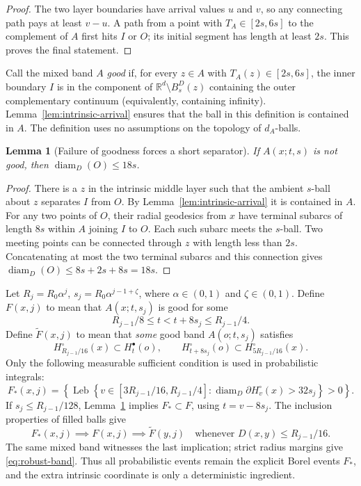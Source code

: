 \documentclass[11pt,reqno]{amsart}
\theoremstyle{plain}
\newtheorem{lemma}[theorem]{Lemma}
\theoremstyle{definition}
\theoremstyle{remark}
\newcommand{\R}{\mathbb R}
\newcommand{\diam}{\operatorname{diam}}
\newcommand{\1}{\mathbf{1}}
\begin{document}
\begin{proof}
The two layer boundaries have arrival values $u$ and $v$, so any connecting path pays at least $v-u$. A path from a point with $T_A\in[2s,6s]$ to the complement of $A$ first hits $I$ or $O$; its initial segment has length at least $2s$. This proves the final statement.
\end{proof}

Call the mixed band $A$ \emph{good} if, for every $z\in A$ with $T_A(z)\in[2s,6s]$, the inner boundary $I$ is in the component of $\R^d\setminus B_s^D(z)$ containing the outer complementary continuum (equivalently, containing infinity). Lemma~\ref{lem:intrinsic-arrival} ensures that the ball in this definition is contained in $A$. The definition uses no assumptions on the topology of $d_A$-balls.

\begin{lemma}[Failure of goodness forces a short separator]\label{lem:good-failure}
If $A(x;t,s)$ is not good, then $\diam_D(O)\le18s$.
\end{lemma}
\begin{proof}
There is a $z$ in the intrinsic middle layer such that the ambient $s$-ball about $z$ separates $I$ from $O$. By Lemma~\ref{lem:intrinsic-arrival} it is contained in $A$. For any two points of $O$, their radial geodesics from $x$ have terminal subarcs of length $8s$ within $A$ joining $I$ to $O$. Each such subarc meets the $s$-ball. Two meeting points can be connected through $z$ with length less than $2s$. Concatenating at most the two terminal subarcs and this connection gives $\diam_D(O)\le8s+2s+8s=18s$.
\end{proof}

Let $R_j=R_0\alpha^j$, $s_j=R_0\alpha^{j-1+\zeta}$, where $\alpha\in(0,1)$ and $\zeta\in(0,1)$. Define $F(x,j)$ to mean that $A(x;t,s_j)$ is good for some
\[
R_{j-1}/8\le t<t+8s_j\le R_{j-1}/4.
\]
Define $\widetilde F(x,j)$ to mean that \emph{some} good band $A(o;t,s_j)$ satisfies
\begin{equation}\label{eq:robust-band}
H_{R_{j-1}/16}^\circ(x)\subset H_t^\bullet(o),\qquad
H_{t+8s_j}^\circ(o)\subset H_{5R_{j-1}/16}^\circ(x).
\end{equation}
Only the following measurable sufficient condition is used in probabilistic integrals:
\begin{equation}\label{eq:Fstar}
F_*(x,j)=\left\{\operatorname{Leb}\left\{v\in[3R_{j-1}/16,R_{j-1}/4]:
\diam_D\partial H_v^\circ(x)>32s_j\right\}>0\right\}.
\end{equation}
If $s_j\le R_{j-1}/128$, Lemma~\ref{lem:good-failure} implies $F_*\subset F$, using $t=v-8s_j$. The inclusion properties of filled balls give
\begin{equation}\label{eq:F-robust}
F_*(x,j)\implies F(x,j)\implies\widetilde F(y,j)
\quad\text{whenever }D(x,y)\le R_{j-1}/16.
\end{equation}
The same mixed band witnesses the last implication; strict radius margins give \eqref{eq:robust-band}. Thus all probabilistic events remain the explicit Borel events $F_*$, and the extra intrinsic coordinate is only a deterministic ingredient.
\end{document}
